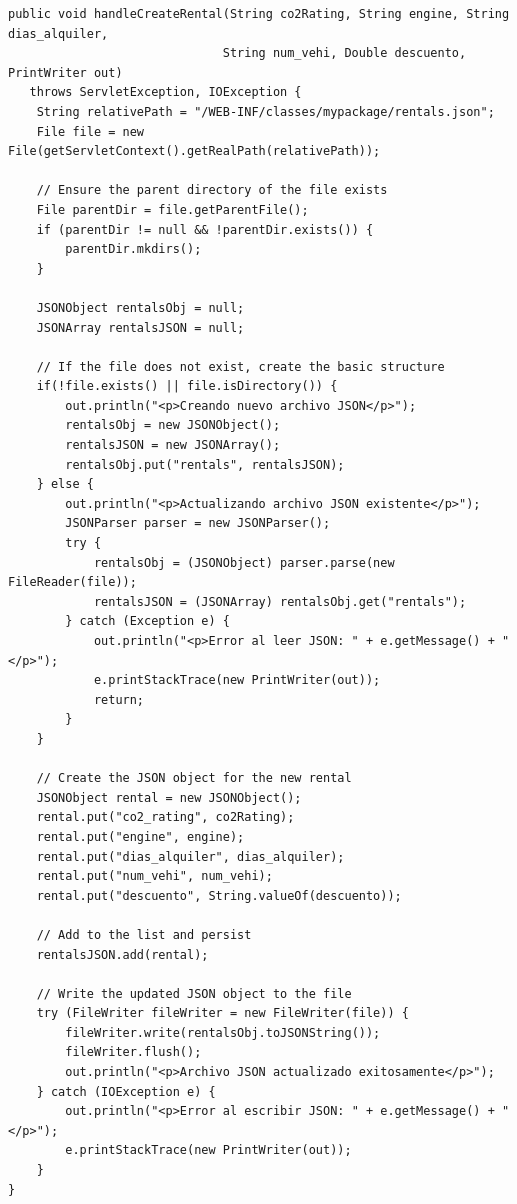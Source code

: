 \documentclass[12pt,a4paper]{article}
\begin{document}
\begin{lstlisting}[style=javastyle,caption=Funció handleCreateRental per persistir dades]
public void handleCreateRental(String co2Rating, String engine, String dias_alquiler, 
                              String num_vehi, Double descuento, PrintWriter out)
   throws ServletException, IOException {
    String relativePath = "/WEB-INF/classes/mypackage/rentals.json";
    File file = new File(getServletContext().getRealPath(relativePath));

    // Ensure the parent directory of the file exists
    File parentDir = file.getParentFile();
    if (parentDir != null && !parentDir.exists()) {
        parentDir.mkdirs();
    }
    
    JSONObject rentalsObj = null;
    JSONArray rentalsJSON = null;
    
    // If the file does not exist, create the basic structure
    if(!file.exists() || file.isDirectory()) { 
        out.println("<p>Creando nuevo archivo JSON</p>");
        rentalsObj = new JSONObject();
        rentalsJSON = new JSONArray();
        rentalsObj.put("rentals", rentalsJSON);
    } else {
        out.println("<p>Actualizando archivo JSON existente</p>");
        JSONParser parser = new JSONParser();
        try {
            rentalsObj = (JSONObject) parser.parse(new FileReader(file));
            rentalsJSON = (JSONArray) rentalsObj.get("rentals");
        } catch (Exception e) {
            out.println("<p>Error al leer JSON: " + e.getMessage() + "</p>");
            e.printStackTrace(new PrintWriter(out));
            return;
        }
    }
    
    // Create the JSON object for the new rental
    JSONObject rental = new JSONObject();
    rental.put("co2_rating", co2Rating);
    rental.put("engine", engine);
    rental.put("dias_alquiler", dias_alquiler);
    rental.put("num_vehi", num_vehi);
    rental.put("descuento", String.valueOf(descuento));

    // Add to the list and persist
    rentalsJSON.add(rental);
            
    // Write the updated JSON object to the file
    try (FileWriter fileWriter = new FileWriter(file)) {
        fileWriter.write(rentalsObj.toJSONString());
        fileWriter.flush();
        out.println("<p>Archivo JSON actualizado exitosamente</p>");
    } catch (IOException e) {
        out.println("<p>Error al escribir JSON: " + e.getMessage() + "</p>");
        e.printStackTrace(new PrintWriter(out));
    }
}
\end{lstlisting}
\end{document}
